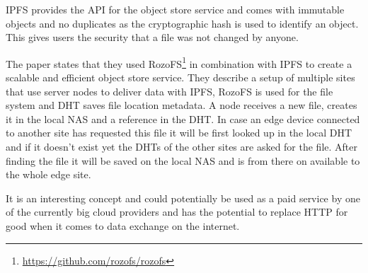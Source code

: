 IPFS provides the API for the object store service and comes with immutable objects and no duplicates as the cryptographic hash is used \cite{8014358} to identify an object. This gives users the security that a file was not changed by anyone.

The paper states that they used RozoFS\footnote{\url{https://github.com/rozofs/rozofs}} in combination with IPFS to create a scalable and efficient object store service.
They describe a setup of multiple sites that use server nodes to deliver data with IPFS, RozoFS is used for the file system and DHT saves file location metadata. A node receives a new file, creates it in the local NAS and a reference in the DHT. In case an edge device connected to another site has requested this file it will be first looked up in the local DHT and if it doesn’t exist yet the DHTs of the other sites are asked for the file. After finding the file it will be saved on the local NAS and is from there on available to the whole edge site.

It is an interesting concept and could potentially be used as a paid service by one of the currently big cloud providers and has the potential to replace HTTP for good when it comes to data exchange on the internet.
